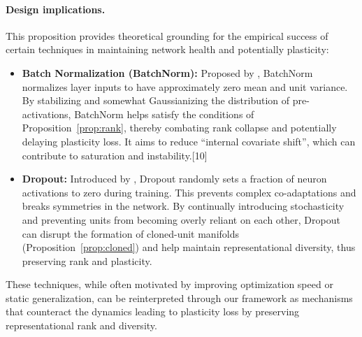 \documentclass{article}
\begin{document}
\paragraph{Design implications.}
This proposition provides theoretical grounding for the empirical success of certain techniques in maintaining network health and potentially plasticity:
\begin{itemize}
    \item \textbf{Batch Normalization (BatchNorm):} Proposed by \citep{ioffe2015batch}, BatchNorm normalizes layer inputs to have approximately zero mean and unit variance. By stabilizing and somewhat Gaussianizing the distribution of pre-activations, BatchNorm helps satisfy the conditions of Proposition~\ref{prop:rank}, thereby combating rank collapse and potentially delaying plasticity loss. It aims to reduce ``internal covariate shift'', which can contribute to saturation and instability.[10]
    \item \textbf{Dropout:} Introduced by \citep{srivastava2014dropout}, Dropout randomly sets a fraction of neuron activations to zero during training. This prevents complex co-adaptations and breaks symmetries in the network. By continually introducing stochasticity and preventing units from becoming overly reliant on each other, Dropout can disrupt the formation of cloned-unit manifolds (Proposition~\ref{prop:cloned}) and help maintain representational diversity, thus preserving rank and plasticity.
\end{itemize}
These techniques, while often motivated by improving optimization speed or static generalization, can be reinterpreted through our framework as mechanisms that counteract the dynamics leading to plasticity loss by preserving representational rank and diversity.
\end{document}
